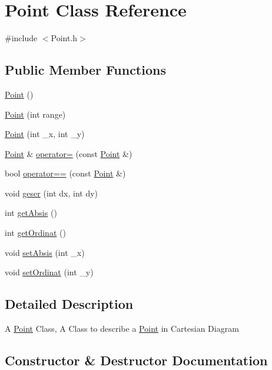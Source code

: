 \hypertarget{class_point}{}\section{Point Class Reference}
\label{class_point}


{\ttfamily \#include $<$Point.\+h$>$}

\subsection*{Public Member Functions}
\begin{DoxyCompactItemize}
\item 
\hyperlink{class_point_ad92f2337b839a94ce97dcdb439b4325a}{Point} ()
\item 
\hyperlink{class_point_ace0a15218bffd7544273b5848de039e0}{Point} (int range)
\item 
\hyperlink{class_point_acf2d96a374f9b7c9c636ba1a2ad42f02}{Point} (int \+\_\+x, int \+\_\+y)
\item 
\hyperlink{class_point}{Point} \& \hyperlink{class_point_a55eeab949e62268da63176d48570eb54}{operator=} (const \hyperlink{class_point}{Point} \&)
\item 
bool \hyperlink{class_point_a9201e61e7884cb0f861f09639cb1c121}{operator==} (const \hyperlink{class_point}{Point} \&)
\item 
void \hyperlink{class_point_ad2432ee1f003f107b898243a1285a14b}{geser} (int dx, int dy)
\item 
int \hyperlink{class_point_ae33b5d39a797830928a7d38376b23d21}{get\+Absis} ()
\item 
int \hyperlink{class_point_a23af70007db8db0ac9f74d1eafecdadc}{get\+Ordinat} ()
\item 
void \hyperlink{class_point_add1782a8109328ad174a8bc829621011}{set\+Absis} (int \+\_\+x)
\item 
void \hyperlink{class_point_adcb07a7e64713bc497e5174b5bec6a10}{set\+Ordinat} (int \+\_\+y)
\end{DoxyCompactItemize}


\subsection{Detailed Description}
A \hyperlink{class_point}{Point} Class, A Class to describe a \hyperlink{class_point}{Point} in Cartesian Diagram 

\subsection{Constructor \& Destructor Documentation}
